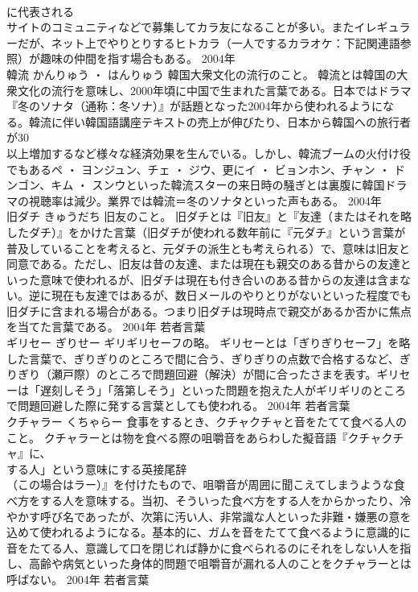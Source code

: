 \documentclass[8pt]{extreport}
\begin{document}
\begin{CJK}{UTF8}{min}
\\	に代表される
\\	サイトのコミュニティなどで募集してカラ友になることが多い。またイレギュラーだが、ネット上でやりとりするヒトカラ（一人でするカラオケ：下記関連語参照）が趣味の仲間を指す場合もある。	2004年	
\\	韓流	かんりゅう ・ はんりゅう	韓国大衆文化の流行のこと。	韓流とは韓国の大衆文化の流行を意味し、2000年頃に中国で生まれた言葉である。日本ではドラマ『冬のソナタ（通称：冬ソナ）』が話題となった2004年から使われるようになる。韓流に伴い韓国語講座テキストの売上が伸びたり、日本から韓国への旅行者が30
\\	以上増加するなど様々な経済効果を生んでいる。しかし、韓流ブームの火付け役でもあるペ ・ ヨンジュン、チェ ・ ジウ、更にイ ・ ビョンホン、チャン ・ ドンゴン、キム ・ スンウといった韓流スターの来日時の騒ぎとは裏腹に韓国ドラマの視聴率は減少。業界では韓流＝冬のソナタといった声もある。	2004年	
\\	旧ダチ	きゅうだち	旧友のこと。	旧ダチとは『旧友』と『友達（またはそれを略したダチ）』をかけた言葉（旧ダチが使われる数年前に『元ダチ』という言葉が普及していることを考えると、元ダチの派生とも考えられる）で、意味は旧友と同意である。ただし、旧友は昔の友達、または現在も親交のある昔からの友達といった意味で使われるが、旧ダチは現在も付き合いのある昔からの友達は含まない。逆に現在も友達ではあるが、数日メールのやりとりがないといった程度でも旧ダチに含まれる場合がある。つまり旧ダチは現時点で親交があるか否かに焦点を当てた言葉である。	2004年	若者言葉	
\\	ギリセー	ぎりせー	ギリギリセーフの略。	ギリセーとは「ぎりぎりセーフ」を略した言葉で、ぎりぎりのところで間に合う、ぎりぎりの点数で合格するなど、ぎりぎり（瀬戸際）のところで問題回避（解決）が間に合ったさまを表す。ギリセーは「遅刻しそう」「落第しそう」といった問題を抱えた人がギリギリのところで問題回避した際に発する言葉としても使われる。	2004年	若者言葉	
\\	クチャラー	くちゃらー	食事をするとき、クチャクチャと音をたてて食べる人のこと。	クチャラーとは物を食べる際の咀嚼音をあらわした擬音語『クチャクチャ』に、
\\	する人」という意味にする英接尾辞
\\	（この場合はラー）』を付けたもので、咀嚼音が周囲に聞こえてしまうような食べ方をする人を意味する。当初、そういった食べ方をする人をからかったり、冷やかす呼び名であったが、次第に汚い人、非常識な人といった非難・嫌悪の意を込めて使われるようになる。基本的に、ガムを音をたてて食べるように意識的に音をたてる人、意識して口を閉じれば静かに食べられるのにそれをしない人を指し、高齢や病気といった身体的問題で咀嚼音が漏れる人のことをクチャラーとは呼ばない。	2004年	若者言葉	

\end{CJK}
\end{document}
